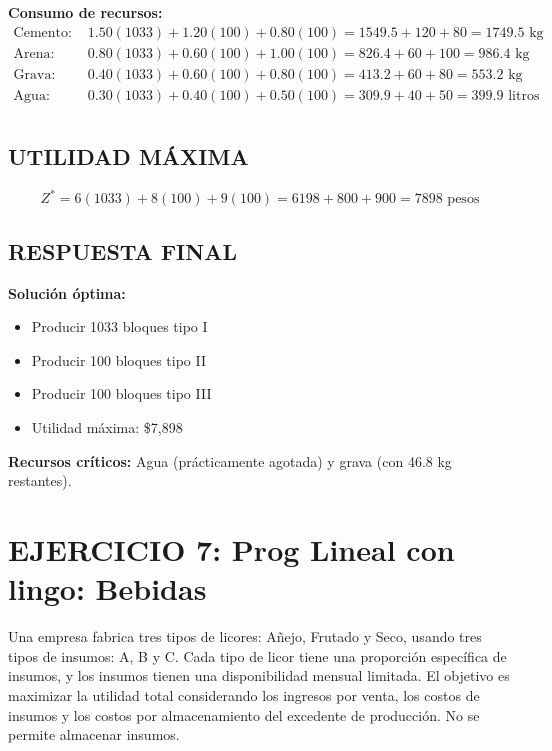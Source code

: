 \documentclass[12pt, a4paper, oneside]{book}
\theoremstyle{definition}
\begin{document}
\textbf{Consumo de recursos:}
\begin{align}
\text{Cemento: } &1.50(1033) + 1.20(100) + 0.80(100) = 1549.5 + 120 + 80 = 1749.5 \text{ kg} \\
\text{Arena: } &0.80(1033) + 0.60(100) + 1.00(100) = 826.4 + 60 + 100 = 986.4 \text{ kg} \\
\text{Grava: } &0.40(1033) + 0.60(100) + 0.80(100) = 413.2 + 60 + 80 = 553.2 \text{ kg} \\
\text{Agua: } &0.30(1033) + 0.40(100) + 0.50(100) = 309.9 + 40 + 50 = 399.9 \text{ litros} \\
\end{align}

\subsection{UTILIDAD MÁXIMA}

\begin{equation}
Z^* = 6(1033) + 8(100) + 9(100) = 6198 + 800 + 900 = 7898 \text{ pesos}
\end{equation}

\subsection{RESPUESTA FINAL}

\textbf{Solución óptima:}
\begin{itemize}
\item Producir 1033 bloques tipo I
\item Producir 100 bloques tipo II  
\item Producir 100 bloques tipo III
\item Utilidad máxima: \$7,898
\end{itemize}

\textbf{Recursos críticos:} Agua (prácticamente agotada) y grava (con 46.8 kg restantes).


\newpage
\section{EJERCICIO 7: Prog Lineal con lingo: Bebidas}
Una empresa fabrica tres tipos de licores: Añejo, Frutado y Seco, usando tres tipos de insumos: A, B y C. Cada tipo de licor tiene una proporción específica de insumos, y los insumos tienen una disponibilidad mensual limitada. El objetivo es maximizar la utilidad total considerando los ingresos por venta, los costos de insumos y los costos por almacenamiento del excedente de producción. No se permite almacenar insumos.
\end{document}

